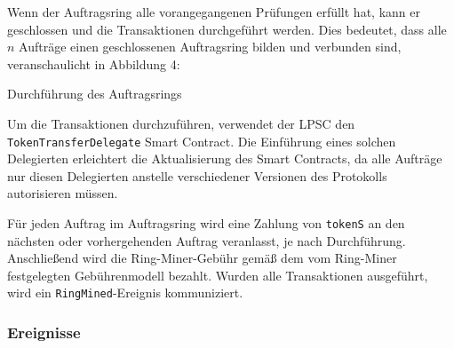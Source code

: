 \documentclass[UTF8,nofonts]{article}
\makeatletter
\newenvironment{figurehere}
 {\def\@captype{figure}}
 {}
\makeatother
\begin{document}
\begin{multicols}{2}
Wenn der Auftragsring alle vorangegangenen Prüfungen erfüllt hat, kann er geschlossen und die Transaktionen durchgeführt werden. Dies bedeutet, dass alle $n$ Aufträge einen geschlossenen Auftragsring bilden und verbunden sind, veranschaulicht in Abbildung 4:

\begin{center}
\begin{figurehere}
\centering
{}
\caption{Durchführung des Auftragsrings}
\label{fig:settlement}
\end{figurehere}
\end{center}

Um die Transaktionen durchzuführen, verwendet der LPSC den \verb|TokenTransferDelegate| Smart Contract. Die Einführung eines solchen Delegierten erleichtert die Aktualisierung des Smart Contracts, da alle Aufträge nur diesen Delegierten anstelle verschiedener Versionen des Protokolls autorisieren müssen.

Für jeden Auftrag im Auftragsring wird eine Zahlung von \verb|tokenS| an den nächsten oder vorhergehenden Auftrag veranlasst, je nach Durchführung. Anschließend wird die Ring-Miner-Gebühr gemäß dem vom Ring-Miner festgelegten Gebührenmodell bezahlt. Wurden alle Transaktionen ausgeführt, wird ein \verb|RingMined|-Ereignis kommuniziert.

\subsubsection{Ereignisse\label{sec:events}}


\end{multicols}
\end{document}

